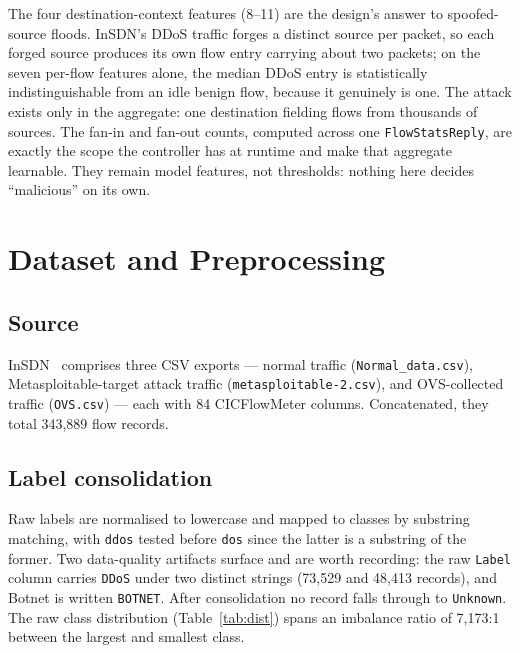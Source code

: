 \documentclass[11pt]{article}
\begin{document}
The four destination-context features (8--11) are the design's answer to spoofed-source
floods. InSDN's DDoS traffic forges a distinct source per packet, so each forged source
produces its own flow entry carrying about two packets; on the seven per-flow features
alone, the median DDoS entry is statistically indistinguishable from an idle benign flow,
because it genuinely is one. The attack exists only in the aggregate: one destination
fielding flows from thousands of sources. The fan-in and fan-out counts, computed across
one \texttt{FlowStatsReply}, are exactly the scope the controller has at runtime and make
that aggregate learnable. They remain model features, not thresholds: nothing here decides
``malicious'' on its own.

\section{Dataset and Preprocessing}

\subsection{Source}
InSDN~\cite{insdn} comprises three CSV exports --- normal traffic
(\texttt{Normal\_data.csv}), Metasploitable-target attack traffic
(\texttt{metasploitable-2.csv}), and OVS-collected traffic (\texttt{OVS.csv}) --- each
with 84 CICFlowMeter columns. Concatenated, they total 343,889 flow records.

\subsection{Label consolidation}
Raw labels are normalised to lowercase and mapped to classes by substring matching, with
\texttt{ddos} tested before \texttt{dos} since the latter is a substring of the former.
Two data-quality artifacts surface and are worth recording: the raw \texttt{Label} column
carries \texttt{DDoS} under two distinct strings (73,529 and 48,413 records), and Botnet
is written \texttt{BOTNET}. After consolidation no record falls through to
\texttt{Unknown}. The raw class distribution (Table~\ref{tab:dist}) spans an imbalance
ratio of 7,173:1 between the largest and smallest class.
\end{document}
